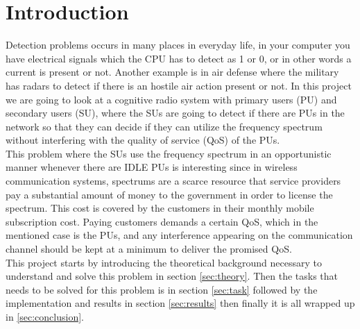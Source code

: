 \section{Introduction}\label{sec:intro}
Detection problems occurs in many places in everyday life, in your computer you have electrical signals which the CPU has to detect as 1 or 0, or in other words a current is present or not. Another example is in air defense where the military has radars to detect if there is an hostile air action present or not. In this project we are going to look at a cognitive radio system with primary users (PU) and secondary users (SU), where the SUs are going to detect if there are PUs in the network so that they can decide if they can utilize the frequency spectrum without interfering with the quality of service (QoS) of the PUs.\\
This problem where the SUs use the frequency spectrum in an opportunistic manner whenever there are IDLE PUs is interesting since in wireless communication systems, spectrums are a scarce resource that service providers pay a substantial amount of money to the government in order to license the spectrum. This cost is covered by the customers in their monthly mobile subscription cost. Paying customers demands a certain QoS, which in the mentioned case is the PUs, and any interference appearing on the communication channel should be kept at a minimum to deliver the promised QoS.\\
This project starts by introducing the theoretical background necessary to understand and solve this problem in section \ref{sec:theory}. Then the tasks that needs to be solved for this problem is in section \ref{sec:task} followed by the implementation and results in section \ref{sec:results} then finally it is all wrapped up in \ref{sec:conclusion}.\\


